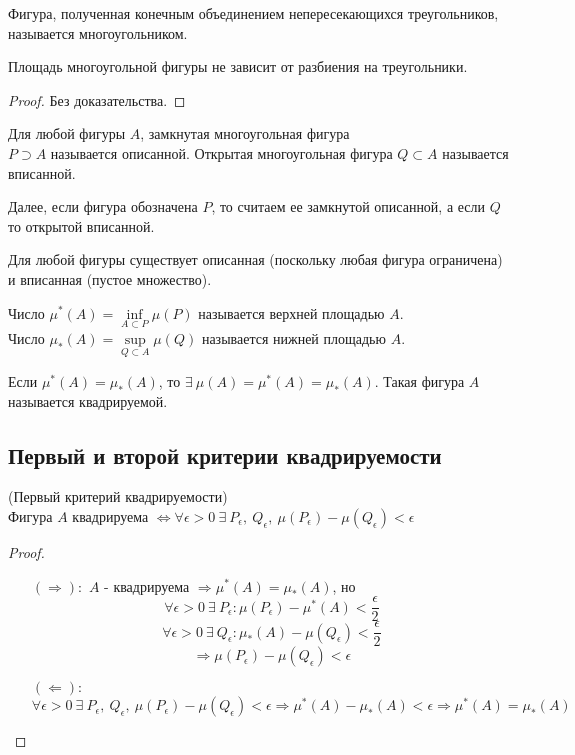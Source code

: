 \begin{definition}
    Фигура, полученная конечным объединением непересекающихся треугольников, называется многоугольником.
\end{definition} 
\begin{theorem}
    Площадь многоугольной фигуры не зависит от разбиения на треугольники.
\end{theorem} 
\begin{proof}
    Без доказательства. %
\end{proof} 
\begin{definition}
    Для любой фигуры $A$, замкнутая многоугольная фигура\\
    $P\supset A$ называется описанной. Открытая многоугольная фигура $Q\subset A$ называется вписанной.
\end{definition}
\begin{comm}
    Далее, если фигура обозначена $P$, то считаем ее замкнутой описанной, а если $Q$ то открытой вписанной. 
\end{comm} 
\begin{comm}
    Для любой фигуры существует описанная (поскольку любая фигура ограничена) и вписанная (пустое множество).
\end{comm} 
\begin{definition}
    Число $\mu^*(A)=\inf\limits_{A\subset P}\mu(P)$ называется верхней площадью $A$.\\
    Число $\mu_*(A)=\sup\limits_{Q\subset A}\mu(Q)$ называется нижней площадью $A$.
\end{definition} 
\begin{definition}
    Если $\mu^*(A)=\mu_*(A)$, то $\exists\ \mu(A)=\mu^*(A)=\mu_*(A)$. Такая фигура $A$ называется квадрируемой.
\end{definition} 
\subsection{Первый и второй критерии квадрируемости}
\begin{theorem}
    (Первый критерий квадрируемости)\\
    Фигура $A$ квадрируема $\Leftrightarrow \forall \epsilon>0\ \exists\ P_{\epsilon},\ Q_{\epsilon},\ \mu(P_{\epsilon})-\mu(Q_{\epsilon})<\epsilon$
\end{theorem} 
\begin{proof}\tab
    \begin{itemize}
        \item[$(\Rightarrow):$] $A$ - квадрируема $\Rightarrow \mu^*(A)=\mu_*(A)$, но
        \[\forall \epsilon>0\ \exists\ P_{\epsilon}: \mu(P_{\epsilon})-\mu^*(A)<\frac{\epsilon}{2}\]
        \[\forall \epsilon>0\ \exists\ Q_{\epsilon}: \mu_*(A)-\mu(Q_{\epsilon})<\frac{\epsilon}{2}\]
        \[\Rightarrow \mu(P_\epsilon)-\mu(Q_{\epsilon})<\epsilon\]
        \item[$(\Leftarrow):$] 
        \[\forall \epsilon>0\ \exists\ P_{\epsilon},\ Q_{\epsilon},\ \mu(P_{\epsilon})-\mu(Q_{\epsilon})<\epsilon \Rightarrow \mu^*(A)-\mu_*(A)<\epsilon \Rightarrow \mu^*(A)=\mu_*(A)\]
    \end{itemize}
\end{proof} 

